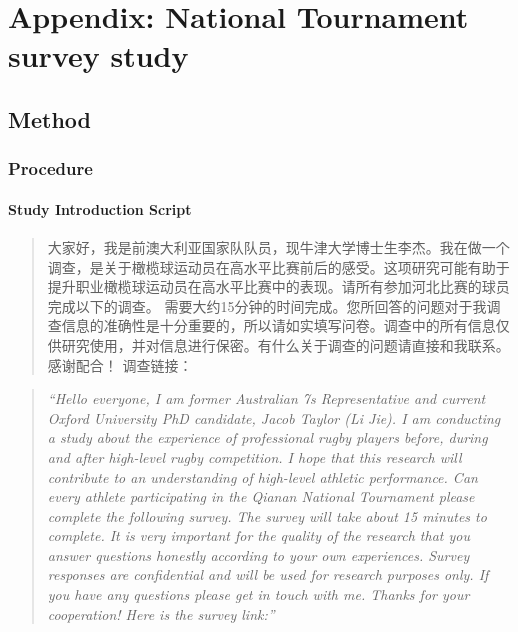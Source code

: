 \chapter{Appendix: National Tournament survey study\label{app8:tournamentSurvey}}



                                      \begin{CJK}{UTF8}{gbsn}










\section{Method\label{app8:method}}



\subsection{Procedure\label{app8:procedure}}


\subsubsection{Study Introduction Script\label{app8:studyIntro}}

\begin{CJK}{UTF8}{gbsn}
  \begin{quote}
    大家好，我是前澳大利亚国家队队员，现牛津大学博士生李杰。我在做一个调查，是关于橄榄球运动员在高水平比赛前后的感受。这项研究可能有助于提升职业橄榄球运动员在高水平比赛中的表现。请所有参加河北比赛的球员完成以下的调查。
    需要大约15分钟的时间完成。您所回答的问题对于我调查信息的准确性是十分重要的，所以请如实填写问卷。调查中的所有信息仅供研究使用，并对信息进行保密。有什么关于调查的问题请直接和我联系。感谢配合！ 调查链接：
  \end{quote}
\end{CJK}

\begin{quote}
      \textit{``Hello everyone, I am former Australian 7s Representative and current Oxford University PhD candidate, Jacob Taylor (Li Jie). I am conducting a study about the experience of professional rugby players before, during and after high-level rugby competition. I hope that this research will contribute to an understanding of high-level athletic performance. Can every athlete participating in the Qianan National Tournament please complete the following survey. The survey will take about 15 minutes to complete. It is very important for the quality of the research that you answer questions honestly according to your own experiences. Survey responses are confidential and will be used for research purposes only. If you have any questions please get in touch with me. Thanks for your cooperation! Here is the survey link:''}
\end{quote}





\end{CJK}
